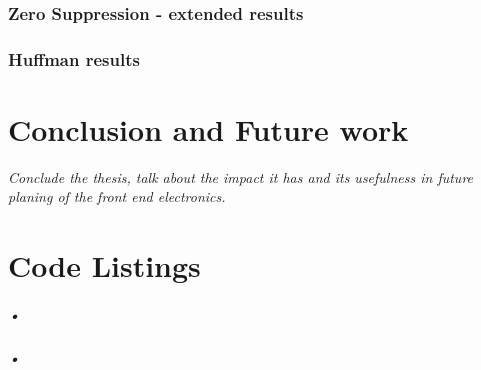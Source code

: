 \documentclass[a4paper, 12pt]{report}
\begin{document}
\subsection{Zero Suppression - extended results}
\subsection{Huffman results}

\chapter{Conclusion and Future work}
\textit{Conclude the thesis, talk about the impact it has and its usefulness in future planing of the front end electronics.}

\appendix
\chapter{Code Listings}
\label{cha:app-code}

\paragraph{•}
\begin{minipage}{\linewidth}

\end{minipage}

\paragraph{•}
\begin{minipage}{\linewidth}

\end{minipage}

{}

\end{document}
